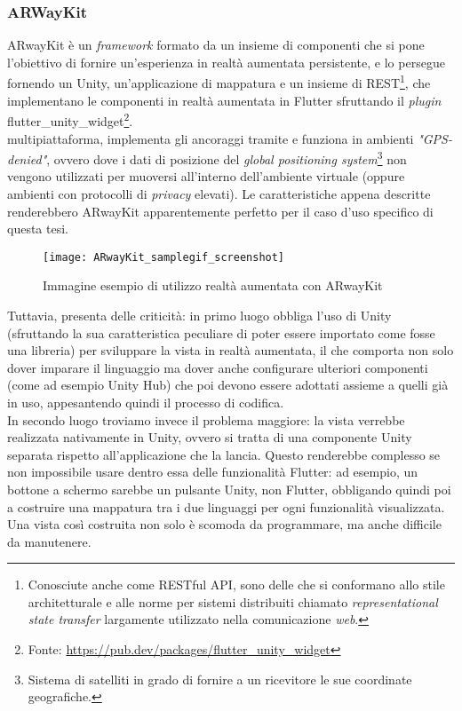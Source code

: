 \subsubsection{ARWayKit}
ARwayKit è un \textit{framework} formato da un insieme di componenti che si pone l'obiettivo di fornire un'esperienza in realtà aumentata persistente, e lo persegue fornendo un \sdk{} Unity, un'applicazione di mappatura e un insieme di \api{} REST\footnote{Conosciute anche come RESTful API, sono delle \api{} che si conformano allo stile architetturale e alle norme per sistemi distribuiti chiamato \textit{representational state transfer} largamente utilizzato nella comunicazione \textit{web}.}, che implementano le componenti in realtà aumentata in Flutter sfruttando il \textit{plugin} flutter\_unity\_widget\footnote{Fonte: \url{https://pub.dev/packages/flutter_unity_widget}}.\\
\e multipiattaforma, implementa gli ancoraggi tramite \asa{} e funziona in ambienti \textit{"GPS-denied"}, ovvero dove i dati di posizione del \textit{global positioning system}\footnote{Sistema di satelliti in grado di fornire a un ricevitore le sue coordinate geografiche.} non vengono utilizzati per muoversi all'interno dell'ambiente virtuale (oppure ambienti con protocolli di \textit{privacy} elevati). Le caratteristiche appena descritte renderebbero ARwayKit apparentemente perfetto per il caso d'uso specifico di questa tesi. 

\begin{figure}[H]
  \centering
  \texttt{[image: ARwayKit\_samplegif\_screenshot]}
  \caption[Realtà aumentata con ARwayKit]{Immagine esempio di utilizzo realtà aumentata con ARwayKit\footnotemark}
\end{figure}

Tuttavia, presenta delle criticità: in primo luogo obbliga l'uso di Unity (sfruttando la sua caratteristica peculiare di poter essere importato come fosse una libreria) per sviluppare la vista in realtà aumentata, il che comporta non solo dover imparare il linguaggio ma dover anche configurare ulteriori componenti (come ad esempio Unity Hub) che poi devono essere adottati assieme a quelli già in uso, appesantendo quindi il processo di codifica.\\
In secondo luogo troviamo invece il problema maggiore: la vista verrebbe realizzata nativamente in Unity, ovvero si tratta di una componente Unity separata rispetto all'applicazione che la lancia.
Questo renderebbe complesso se non impossibile usare dentro essa delle funzionalità Flutter: ad esempio, un bottone a schermo sarebbe un pulsante Unity, non Flutter, obbligando quindi poi a costruire una mappatura tra i due linguaggi per ogni funzionalità visualizzata.\\ 
Una vista così costruita non solo è scomoda da programmare, ma anche difficile da manutenere.

